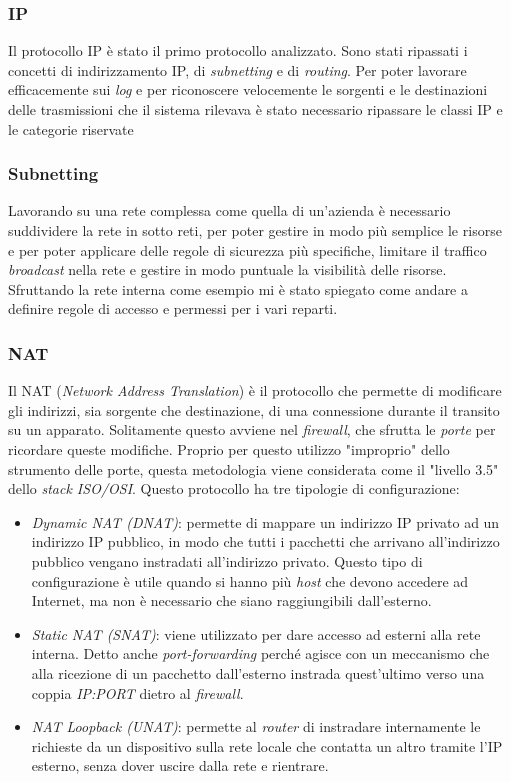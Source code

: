 \subsubsection{IP}

Il protocollo IP è stato il primo protocollo analizzato. Sono stati ripassati i concetti di indirizzamento IP, di \emph{subnetting} e di \emph{routing}. Per poter lavorare efficacemente sui \emph{log} e per riconoscere velocemente le sorgenti e le destinazioni delle trasmissioni che il sistema rilevava è stato necessario ripassare le classi IP e le categorie riservate

\subsubsection{Subnetting}

Lavorando su una rete complessa come quella di un'azienda è necessario suddividere la rete in sotto reti, per poter gestire in modo più semplice le risorse e per poter applicare delle regole di sicurezza più specifiche, limitare il traffico \emph{broadcast} nella rete e gestire in modo puntuale la visibilità delle risorse. Sfruttando la rete interna come esempio mi è stato spiegato come andare a definire regole di accesso e permessi per i vari reparti.

\subsubsection{NAT}

Il NAT (\emph{Network Address Translation}) è il protocollo che permette di modificare gli indirizzi, sia sorgente che destinazione, di una connessione durante il transito su un apparato. Solitamente questo avviene nel \emph{firewall}, che sfrutta le \emph{porte} per ricordare queste modifiche. Proprio per questo utilizzo "improprio" dello strumento delle porte, questa metodologia viene considerata come il "livello 3.5" dello \emph{stack ISO/OSI}. Questo protocollo ha tre tipologie di configurazione:

\begin{itemize}
    \item \emph{Dynamic NAT (DNAT)}: permette di mappare un indirizzo IP privato ad un indirizzo IP pubblico, in modo che tutti i pacchetti che arrivano all'indirizzo pubblico vengano instradati all'indirizzo privato. Questo tipo di configurazione è utile quando si hanno più \emph{host} che devono accedere ad Internet, ma non è necessario che siano raggiungibili dall'esterno.
    \item \emph{Static NAT (SNAT)}: viene utilizzato per dare accesso ad esterni alla rete interna. Detto anche \emph{port-forwarding} perché agisce con un meccanismo che alla ricezione di un pacchetto dall'esterno instrada quest'ultimo verso una coppia \emph{IP:PORT} dietro al \emph{firewall}.
    \item \emph{NAT Loopback (UNAT)}: permette al \emph{router} di instradare internamente le richieste da un dispositivo sulla rete locale che contatta un altro tramite l'IP esterno, senza dover uscire dalla rete e rientrare.
\end{itemize}


